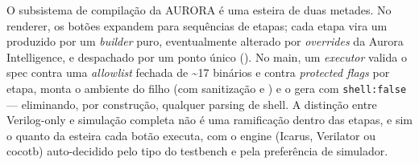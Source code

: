 O subsistema de compilação da AURORA é uma esteira de duas metades. No renderer,
os botões expandem para sequências de etapas; cada etapa vira um
 produzido por um \emph{builder} puro, eventualmente alterado
por \emph{overrides} da Aurora Intelligence, e despachado por um ponto único
(). No main, um \emph{executor} valida o spec contra uma
\emph{allowlist} fechada de \textasciitilde17 binários e contra \emph{protected
flags} por etapa, monta o ambiente do filho (com sanitização e
) e o gera com \lstinline|shell:false| — eliminando, por
construção, qualquer parsing de shell. A distinção entre Verilog-only e simulação
completa não é uma ramificação dentro das etapas, e sim o quanto da esteira cada
botão executa, com o engine (Icarus, Verilator ou cocotb) auto-decidido pelo tipo
do testbench e pela preferência de simulador.
